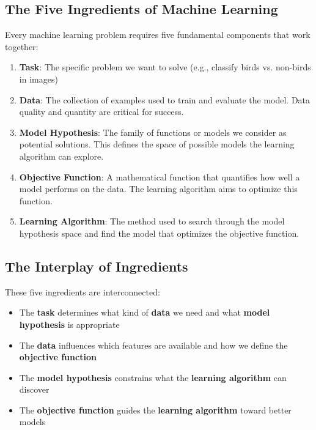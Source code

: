 \documentclass[11pt,a4paper]{article}
\theoremstyle{definition}
\theoremstyle{plain}
\theoremstyle{remark}
\begin{document}
\subsection{The Five Ingredients of Machine Learning}

Every machine learning problem requires five fundamental components that work together:

\begin{enumerate}
    \item \textbf{Task}: The specific problem we want to solve (e.g., classify birds vs. non-birds in images)
    
    \item \textbf{Data}: The collection of examples used to train and evaluate the model. Data quality and quantity are critical for success.
    
    \item \textbf{Model Hypothesis}: The family of functions or models we consider as potential solutions. This defines the space of possible models the learning algorithm can explore.
    
    \item \textbf{Objective Function}: A mathematical function that quantifies how well a model performs on the data. The learning algorithm aims to optimize this function.
    
    \item \textbf{Learning Algorithm}: The method used to search through the model hypothesis space and find the model that optimizes the objective function.
\end{enumerate}

\subsection{The Interplay of Ingredients}

These five ingredients are interconnected:
\begin{itemize}
    \item The \textbf{task} determines what kind of \textbf{data} we need and what \textbf{model hypothesis} is appropriate
    \item The \textbf{data} influences which features are available and how we define the \textbf{objective function}
    \item The \textbf{model hypothesis} constrains what the \textbf{learning algorithm} can discover
    \item The \textbf{objective function} guides the \textbf{learning algorithm} toward better models
\end{itemize}
\end{document}
